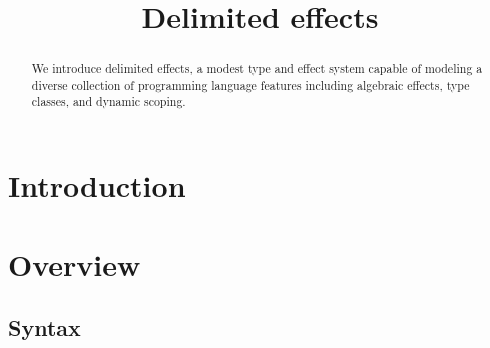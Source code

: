 \documentclass[12pt]{article}
\title{Delimited effects}
\date{}
\begin{document}
  \maketitle

  \begin{abstract}
    We introduce delimited effects, a modest type and effect system capable of modeling a diverse collection of programming language features including algebraic effects, type classes, and dynamic scoping.
  \end{abstract}

  \section{Introduction}

    \iffalse
      \begin{lstlisting}[gobble=4]
        effect IO
          getLine   : String ! IO
          printLine : String -> () ! IO
      \end{lstlisting}

      \begin{lstlisting}[gobble=4]
        effect Monoid a
          mempty  : a ! Monoid a
          mappend : a -> a -> a ! Monoid a
      \end{lstlisting}
    \fi

  \section{Overview}

    \subsection{Syntax}
\end{document}
